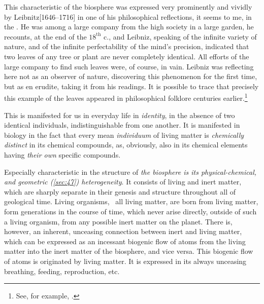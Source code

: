 This characteristic of the biosphere was expressed very prominently and vividly
by Leibnitz[1646--1716] in one of his philosophical reflections, it seems to
me, in the .  He was among a large company from the high society in a large garden, he
recounts, at the end of the $18^\mathrm{th}$ c., and Leibniz, speaking of the
infinite variety of nature, and of the infinite perfectability of the mind's
precision, indicated that two leaves of
any tree or plant are never completely identical.  All efforts of the large
company to find such leaves were, of course, in vain.  Leibniz was reflecting
here not as an observer of nature, discovering this phenomenon for the first
time, but as en erudite, taking it from his readings.  It is possible to trace
that precisely this example of the leaves appeared in philosophical folklore
centuries earlier.\footnote{
	See, for example, \cite[кн.~2,
	с.~54]{carus1913prirode}\nocite{carus1936prirode, carus1851nature}.}

This is manifested for us in everyday life in
\emph{identity}, in the absence of two identical
individuals, indistinguishable from one another.  It is manifested in biology
in the fact that every mean \emph{individuum} of living
matter is \emph{chemically distinct} in its chemical compounds, as, obviously,
also in its chemical elements having \emph{their own} specific compounds.


\Section %
Especially characteristic in the structure of \emph{the biosphere is its
physical-chemical, and geometric \emph{(\autoref{sec:47})} heterogeneity}.  It
consists of living and inert matter, which are sharply separate in their
genesis and structure throughout all of geological time.  Living organisms,
\ie\ all living matter, are born from living matter, form generations in the
course of time, which never arise directly, outside of such a living organism,
from any possible inert matter on the planet.  There is, however, an inherent,
unceasing connection
between inert and living matter, which can be expressed as an incessant
biogenic flow of atoms from the living matter into the inert matter of the
biosphere, and vice versa.  This biogenic flow of atoms is originated by living
matter.  It is expressed in its always unceasing breathing, feeding,
reproduction, etc.

